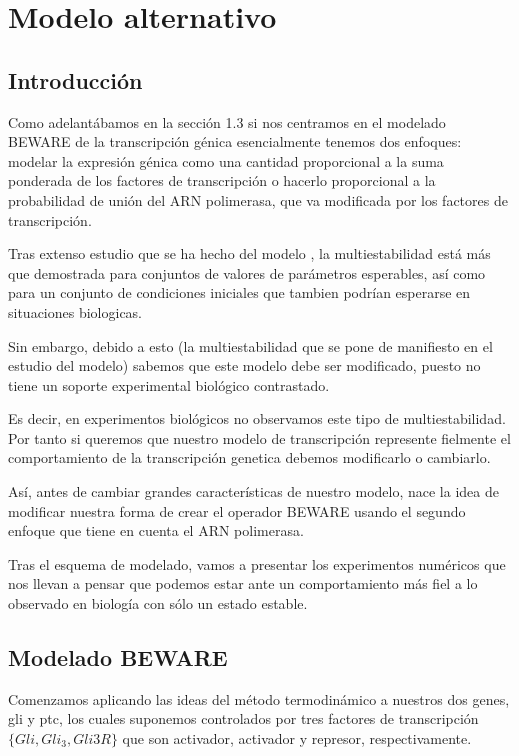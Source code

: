 \chapter{Modelo alternativo}

\label{ch:modelo_alternativo}

\section{Introducción}

Como adelantábamos en la sección 1.3 si nos centramos en el modelado BEWARE de la transcripción génica esencialmente tenemos dos enfoques: modelar la expresión génica como una cantidad proporcional a la suma ponderada de los factores de transcripción o hacerlo proporcional a la probabilidad de unión del ARN polimerasa, que va modificada por los factores de transcripción.

Tras extenso estudio que se ha hecho del modelo \cite{schaffer}, la multiestabilidad está más que demostrada para conjuntos de valores de parámetros esperables, así como para un conjunto de condiciones iniciales que tambien podrían esperarse en situaciones biologicas. 

Sin embargo, debido a esto (la multiestabilidad que se pone de manifiesto en el estudio del modelo) sabemos que este modelo debe ser modificado, puesto no tiene un soporte experimental biológico contrastado.

Es decir, en experimentos biológicos no observamos este tipo de multiestabilidad. Por tanto si queremos que nuestro modelo de transcripción represente fielmente el comportamiento de la transcripción genetica debemos modificarlo o cambiarlo.

Así, antes de cambiar grandes características de nuestro modelo, nace la idea de modificar nuestra forma de crear el operador BEWARE usando el segundo enfoque que tiene en cuenta el ARN polimerasa. 

Tras el esquema de modelado, vamos a presentar los experimentos numéricos que nos llevan a pensar que podemos estar ante un comportamiento más fiel a lo observado en biología con sólo un estado estable. 

\section{Modelado BEWARE}
Comenzamos aplicando las ideas del método termodinámico a nuestros dos genes, gli y ptc, los cuales suponemos controlados por tres factores de transcripción $\{Gli, Gli_3, Gli3R\} $ que son activador, activador y represor, respectivamente.

